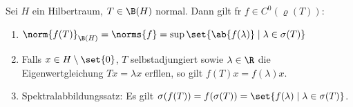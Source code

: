 	\begin{theorem}\label{eigenschaften_stetiger_kalkuel}
		Sei $H$ ein Hilbertraum, \(T\in \B(H)\) normal.  Dann gilt f\us r \(f\in C^0(\varrho(T))\):
		\begin{enumerate}
			\item \(\norm{f(T)}_{\B(H)} = \norms{f} = \sup\set{\ab{f(\lambda)}\;\vert\;\lambda \in \sigma(T)}\) \label{eigenschaften_stetiger_kalkuel_1}
			\item Falls \(x\in H\setminus\set{0}\), \(T\) selbstadjungiert sowie \(\lambda \in \R\) die Eigenwertgleichung \(Tx = \lambda x\) erf\us llen, so gilt \(f(T)x = f(\lambda)x\)\;.
			\item Spektralabbildungssatz: Es gilt \(\sigma(f(T)) = f(\sigma(T)) = \set{f(\lambda)\;\vert\;\lambda \in \sigma(T)}\).
		\end{enumerate}
	\end{theorem}
